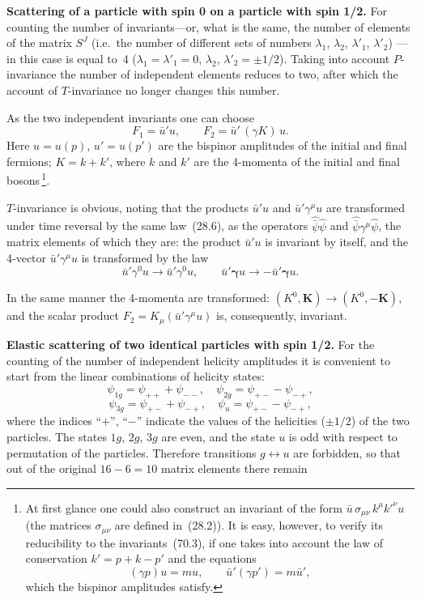 \textbf{Scattering of a particle with spin 0 on a particle with spin 1/2.} For counting the number of invariants---or, what is the same, the number of elements of the matrix $S^J$ (i.e.\ the number of different sets of numbers $\lambda_1$, $\lambda_2$, $\lambda'_1$, $\lambda'_2$) --- in this case is equal to~4 ($\lambda_1 = \lambda'_1 = 0$, $\lambda_2$, $\lambda'_2 = \pm 1/2$). Taking into account $P$-invariance the number of independent elements reduces to two, after which the account of $T$-invariance no longer changes this number.

As the two independent invariants one can choose
\begin{equation}
F_1 = \bar{u}'u,\qquad F_2 = \bar{u}'\,(\gamma K)\,u.
\tag{70.3}
\end{equation}
Here $u = u(p)$, $u' = u(p')$ are the bispinor amplitudes of the initial and final fermions; $K = k + k'$, where $k$ and $k'$ are the 4-momenta of the initial and final bosons\,\footnote{At first glance one could also construct an invariant of the form $\bar{u}\,\sigma_{\mu\nu}\,k^\mu k'^\nu u$ (the matrices $\sigma_{\mu\nu}$ are defined in~(28.2)). It is easy, however, to verify its reducibility to the invariants~(70.3), if one takes into account the law of conservation $k' = p + k - p'$ and the equations
\[
(\gamma p)u = mu,\qquad \bar{u}'(\gamma p') = m\bar{u}',
\]
which the bispinor amplitudes satisfy.}.

$T$-invariance is obvious, noting that the products $\bar{u}'u$ and $\bar{u}'\gamma^\mu u$ are transformed under time reversal by the same law~(28.6), as the operators $\hat{\bar{\psi}}\hat{\psi}$ and $\hat{\bar{\psi}}\gamma^\mu\hat{\psi}$, the matrix elements of which they are: the product $\bar{u}'u$ is invariant by itself, and the 4-vector $\bar{u}'\gamma^\mu u$ is transformed by the law
\[
\bar{u}'\gamma^0 u \to \bar{u}'\gamma^0 u,\qquad \bar{u}'\boldsymbol{\gamma}u \to -\bar{u}'\boldsymbol{\gamma}u.
\]

In the same manner the 4-momenta are transformed: $(K^0, \mathbf{K}) \to (K^0, -\mathbf{K})$, and the scalar product $F_2 = K_\mu(\bar{u}'\gamma^\mu u)$ is, consequently, invariant.

\textbf{Elastic scattering of two identical particles with spin 1/2.} For the counting of the number of independent helicity amplitudes it is convenient to start from the linear combinations of helicity states:
\[
\psi_{1g} = \psi_{++} + \psi_{--},\quad \psi_{2g} = \psi_{+-} - \psi_{-+},
\]
\[
\psi_{3g} = \psi_{+-} + \psi_{-+},\quad \psi_u = \psi_{+-} - \psi_{-+},
\]
where the indices ``$+$'', ``$-$'' indicate the values of the helicities ($\pm 1/2$) of the two particles. The states $1g$, $2g$, $3g$ are even, and the state $u$ is odd with respect to permutation of the particles. Therefore transitions $g \leftrightarrow u$ are forbidden, so that out of the original $16 - 6 = 10$ matrix elements there remain

